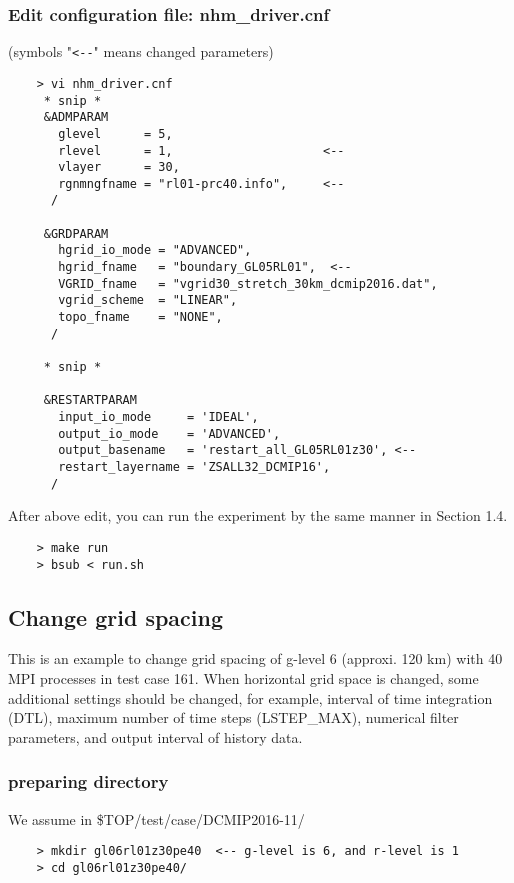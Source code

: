 \subsubsection{Edit configuration file: nhm\_driver.cnf}
 (symbols "\verb|<--|" means changed parameters)
 \begin{verbatim}
    > vi nhm_driver.cnf
     * snip *
     &ADMPARAM
       glevel      = 5,
       rlevel      = 1,                     <--
       vlayer      = 30,
       rgnmngfname = "rl01-prc40.info",     <--
      /

     &GRDPARAM
       hgrid_io_mode = "ADVANCED",
       hgrid_fname   = "boundary_GL05RL01",  <--
       VGRID_fname   = "vgrid30_stretch_30km_dcmip2016.dat",
       vgrid_scheme  = "LINEAR",
       topo_fname    = "NONE",
      /

     * snip *

     &RESTARTPARAM
       input_io_mode     = 'IDEAL',
       output_io_mode    = 'ADVANCED',
       output_basename   = 'restart_all_GL05RL01z30', <--
       restart_layername = 'ZSALL32_DCMIP16',
      /
 \end{verbatim}

 \noindent After above edit, you can run the experiment
 by the same manner in Section 1.4.
 \begin{verbatim}
    > make run
    > bsub < run.sh
 \end{verbatim}


\subsection{Change grid spacing}
 \noindent This is an example to change grid spacing of g-level 6
 (approxi. 120 km) with 40 MPI processes in test case 161.
 When horizontal grid space is changed, some additional settings
 should be changed, for example, interval of time integration (DTL),
 maximum number of time steps (LSTEP\_MAX), numerical filter parameters,
 and output interval of history data.

\subsubsection{preparing directory}
 We assume in \${TOP}/test/case/DCMIP2016-11/
 \begin{verbatim}
    > mkdir gl06rl01z30pe40  <-- g-level is 6, and r-level is 1
    > cd gl06rl01z30pe40/
 \end{verbatim}

